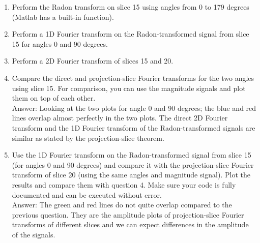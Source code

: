 \documentclass[12pt,twoside]{article}
\begin{document}
\begin{enumerate}
    \item Perform the Radon transform on slice 15 using angles from 0 to 179 degrees (Matlab has a built-in function).
    \item Perform a 1D Fourier transform on the Radon-transformed signal from slice 15 for angles 0 and 90 degrees.
    \item Perform a 2D Fourier transform of slices 15 and 20.
    \item Compare the direct and projection-slice Fourier transforms for the two angles using slice 15. 
    For comparison, you can use the magnitude signals and plot them on top of each other.\\
    Answer: Looking at the two plots for angle 0 and 90 degrees; 
    the blue and red lines overlap almost perfectly in the two plots. The direct 2D Fourier transform and the 1D Fourier transform of the Radon-transformed signals
    are similar as stated by the projection-slice theorem.
    
    	
    \item Use the 1D Fourier transform on the Radon-transformed signal from slice 15 (for angles 0 and 90 degrees) and 
    compare it with the projection-slice Fourier transform of slice 20 (using the same angles and magnitude signal). 
    Plot the results and compare them with question 4.
    Make sure your code is fully documented and can be executed without error.\\
    Answer: The green and red lines do not quite overlap  compared to the previous question.
    They are the amplitude plots of  projection-slice Fourier transforms of different slices and we can expect differences in the amplitude of the signals.
   \end{enumerate}
\end{document}
